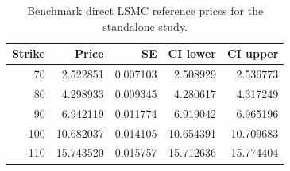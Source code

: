 \begin{table}[htbp]
\centering
\caption{Benchmark direct LSMC reference prices for the standalone study.}
\label{tab:bgk_r02_calibrated_t1_nex12-benchmark-references}
\begin{tabular}{rrrrr}
\toprule
Strike & Price & SE & CI lower & CI upper \\
\midrule
70 & 2.522851 & 0.007103 & 2.508929 & 2.536773 \\
80 & 4.298933 & 0.009345 & 4.280617 & 4.317249 \\
90 & 6.942119 & 0.011774 & 6.919042 & 6.965196 \\
100 & 10.682037 & 0.014105 & 10.654391 & 10.709683 \\
110 & 15.743520 & 0.015757 & 15.712636 & 15.774404 \\
\bottomrule
\end{tabular}
\end{table}
